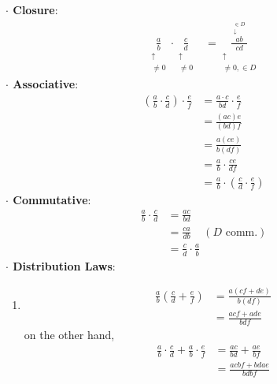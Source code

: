 \begin{theorem}
    \noindent \textbf{$\cdot$ Closure}: \\
    \begin{align}
        \underset{\substack{\uparrow \\ \neq 0}}{\frac{a}{b}}\cdot  \underset{\substack{\uparrow \\ \neq 0}}{\frac{c}{d}} &= \underset{\substack{\uparrow \\ \neq 0, \in D}}{\frac{\overset{\substack{\in D \\ \downarrow}}{ab}}{cd}}\nonumber
    \end{align}
    \noindent \textbf{$\cdot$ Associative}: \\
    \begin{align}
        \left(\frac{a}{b}\cdot \frac{c}{d} \right) \cdot \frac{e}{f} &= \frac{a\cdot c}{bd} \cdot \frac{e}{f}\nonumber \\
        &= \frac{(ac)e}{(bd)f}\nonumber \\
        &= \frac{a(ce)}{b(df)} \nonumber \\
        &= \frac{a}{b}\cdot \frac{ce}{df} \nonumber \\
        &= \frac{a}{b} \cdot \left(\frac{c}{d}\cdot \frac{e}{f}\right) \nonumber
    \end{align}
    \noindent \textbf{$\cdot$ Commutative}: \\
    \begin{align}
        \frac{a}{b}\cdot \frac{c}{d}&= \frac{ac}{bd} \nonumber \\
        &= \frac{ca}{db} \ \ \ \ \ (D\text{ comm.}) \nonumber \\
        &= \frac{c}{d}\cdot \frac{a}{b} \nonumber
    \end{align}
    \noindent \textbf{$\cdot$ Distribution Laws}: \\
    \begin{enumerate}
        \item \begin{align}
            \frac{a}{b}\left(\frac{c}{d}+\frac{e}{f}\right) &= \frac{a(cf+de)}{b(df)}\nonumber \\
            &= \frac{acf+ade}{bdf} \nonumber
        \end{align}
        on the other hand,
        \begin{align}
            \frac{a}{b}\cdot \frac{c}{d}+\frac{a}{b}\cdot \frac{e}{f} &= \frac{ac}{bd}+\frac{ae}{bf} \nonumber \\
            &= \frac{acbf+bdae}{bdbf} \nonumber \\

\end{align}
\end{enumerate}
\end{theorem}
